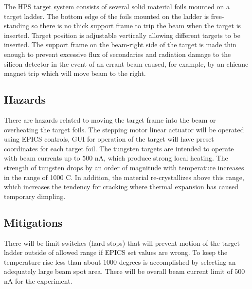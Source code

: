 
The HPS target system consists of several solid material foils mounted on a target ladder. The bottom edge of the foils mounted on the ladder is free-standing so there
is no thick support frame to trip the beam when the target is inserted. Target position is adjustable vertically allowing different targets to be inserted. The support
frame on the beam-right side of the target is made thin enough to
prevent excessive flux of secondaries and radiation damage to the silicon detector in the event of an errant
beam caused, for example, by an chicane magnet trip which will move beam to the right.
               
\subsection{Hazards} 

\indent

There are hazards related to moving the target frame into the beam or overheating the target foils. The stepping motor linear
actuator will be operated using EPICS controls, GUI for operation of the target will have preset coordinates for each target foil.  
The tungsten targets are intended to operate with beam currents up to $500$ nA, which produce strong local heating. The strength of tungsten drops by an order of magnitude with temperature increases in the range of 1000 C. In addition, the material re-crystallizes above
this range, which increases the tendency for cracking where thermal expansion has caused temporary dimpling. 

\subsection{Mitigations}

\indent

There will be limit switches (hard stops) that will prevent motion of the target ladder outside of allowed range if EPICS set values are wrong. To keep the temperature rise less than
about 1000 degrees is accomplished by selecting an
adequately large beam spot area. There will be overall beam current limit of $500$ nA for the experiment.

